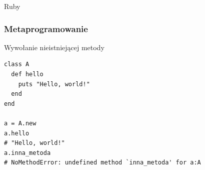 \begin{frame}[plain]
\begin{block}{}
\begin{centering}
\color{violet}Ruby
   
   
   

\end{centering}
\end{block}
\end{frame}

\begin{frame}[fragile]
\frametitle{Metaprogramowanie}
\begin{block}{Wywołanie nieistniejącej metody}
\begin{lstlisting}[style=Ruby]
class A
  def hello
    puts "Hello, world!"
  end
end

a = A.new
a.hello
# "Hello, world!"
a.inna_metoda
# NoMethodError: undefined method `inna_metoda' for a:A
\end{lstlisting}
\end{block}
\end{frame}


